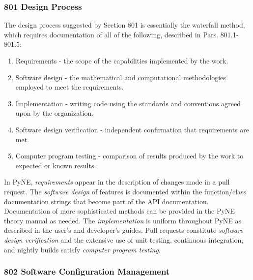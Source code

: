 \documentclass{anstrans}
\begin{document}
\subsubsection{801 Design Process}

The design process suggested by Section 801 is essentially the waterfall method, which requires documentation of all of the following, described in Pars. 801.1-801.5:

\begin{enumerate} 
\item{Requirements - the scope of the capabilities implemented by the work.}
\item{Software design - the mathematical and computational methodologies employed to meet the requirements.}
\item{Implementation - writing code using the standards and conventions agreed upon by the organization.}
\item{Software design verification - independent confirmation that requirements are met.}
\item{Computer program testing - comparison of results produced by the work to expected or known results.}
\end{enumerate}

In PyNE, \emph{requirements} appear in the description of changes made in
a pull request. 
The \emph{software design} of features is documented
within the function/class documentation strings that become part of the API
documentation. Documentation of more sophisticated methods can be provided in the PyNE
theory manual as needed. The \emph{implementation} is uniform throughout PyNE as 
described in the user's and developer's guides. Pull requests constitute 
\emph{software design verification} and the extensive use of unit testing, 
continuous integration, and nightly builds
satisfy \emph{computer program testing}.

\subsubsection{802 Software Configuration Management}
\end{document}
